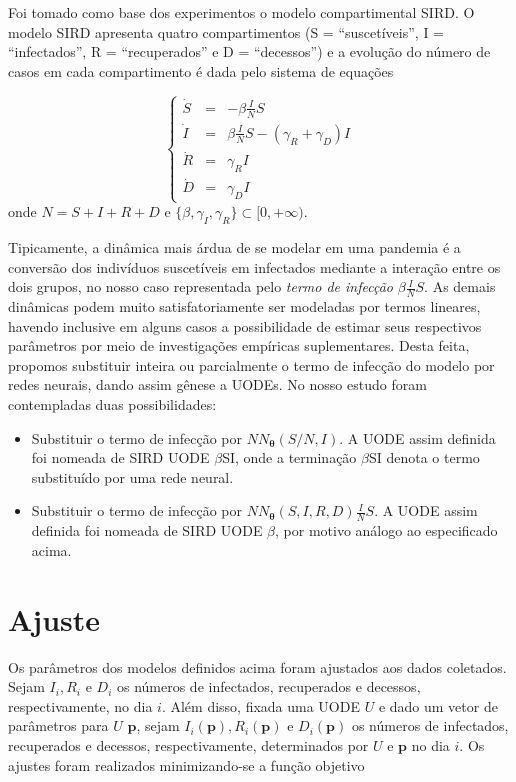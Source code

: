 \documentclass[a4paper,12pt]{article}
\begin{document}
Foi tomado como base dos experimentos o modelo compartimental SIRD. O modelo SIRD apresenta quatro compartimentos (S = “suscetíveis”, I = “infectados”, R = “recuperados” e D = “decessos”) e a evolução do número de casos em cada compartimento é dada pelo sistema de equações

$$
\left\{
\begin{array}{ccl}
	\dot S & = & -\beta \frac{I}{N} S \\
	\dot I & = &  \beta \frac{I}{N} S - \left(\gamma_R + \gamma_D\right) I\\
	\dot R & = & \gamma_R I \\
	\dot D & = & \gamma_D I
\end{array}
\right.
$$
onde $N = S+I+R+D$ e $\{\beta, \gamma_I, \gamma_R\} \subset [0, +\infty)$.

Tipicamente, a dinâmica mais árdua de se modelar em uma pandemia é a conversão dos indivíduos suscetíveis em infectados mediante a interação entre os dois grupos, no nosso caso representada pelo \textit{termo de infecção} $\beta\frac{I}{N}S$. As demais dinâmicas podem muito satisfatoriamente ser modeladas por termos lineares, havendo inclusive em alguns casos a possibilidade de estimar seus respectivos parâmetros por meio de investigações empíricas suplementares. Desta feita, propomos substituir inteira ou parcialmente o termo de infecção do modelo por redes neurais, dando assim gênese a UODEs. No nosso estudo foram contempladas duas possibilidades:

\begin{itemize}
	\item Substituir o termo de infecção por $N\!N_{\boldsymbol{\theta}}(S/N, I)$. A UODE assim definida foi nomeada de SIRD UODE $\beta$SI, onde a terminação $\beta$SI denota o termo substituído por uma rede neural.
	\item Substituir o termo de infecção por $N\!N_{\boldsymbol{\theta}}(S,I,R,D)\frac{I}{N}S$. A UODE assim definida foi nomeada de SIRD UODE $\beta$, por motivo análogo ao especificado acima.
\end{itemize}

\section{Ajuste}

Os parâmetros dos modelos definidos acima foram ajustados aos dados coletados. Sejam $I_i, R_i$ e $D_i$ os números de infectados, recuperados e decessos, respectivamente, no dia $i$. Além disso, fixada uma UODE $U$ e dado um vetor de parâmetros para $U$ $\mathbf{p}$, sejam $I_i(\mathbf{p}), R_i(\mathbf{p})$ e $D_i(\mathbf{p})$ os números de infectados, recuperados e decessos, respectivamente, determinados por $U$ e $\mathbf{p}$ no dia $i$. Os ajustes foram realizados minimizando-se a função objetivo
\end{document}
